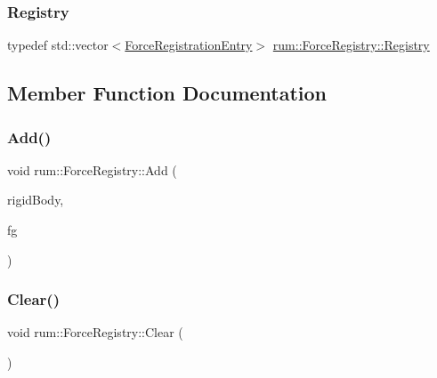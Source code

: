 \subsubsection{\texorpdfstring{Registry}{Registry}}
{\footnotesize\ttfamily typedef std\+::vector$<$\hyperlink{structrum_1_1_force_registry_1_1_force_registration_entry}{Force\+Registration\+Entry}$>$ \hyperlink{classrum_1_1_force_registry_a9523605286e7ef4f693c3c485df757a6}{rum\+::\+Force\+Registry\+::\+Registry}\hspace{0.3cm}{\ttfamily [protected]}}



\subsection{Member Function Documentation}
\mbox{\label{classrum_1_1_force_registry_a3062f9ea0518bdef2624b39e17eb95d4}} 
\subsubsection{\texorpdfstring{Add()}{Add()}}
{\footnotesize\ttfamily void rum\+::\+Force\+Registry\+::\+Add (\begin{DoxyParamCaption}\item[{\hyperlink{classrum_1_1_rigid_body}{Rigid\+Body} $\ast$}]{rigid\+Body,  }\item[{\hyperlink{classrum_1_1_force_generator}{Force\+Generator} $\ast$}]{fg }\end{DoxyParamCaption})}

\mbox{\label{classrum_1_1_force_registry_a571da7ffd245ae2b09dd5538881a19de}} 
\subsubsection{\texorpdfstring{Clear()}{Clear()}}
{\footnotesize\ttfamily void rum\+::\+Force\+Registry\+::\+Clear (\begin{DoxyParamCaption}{ }\end{DoxyParamCaption})}

\mbox{\label{classrum_1_1_force_registry_a26782e5d963910c3b61b27362591ba36}} 
